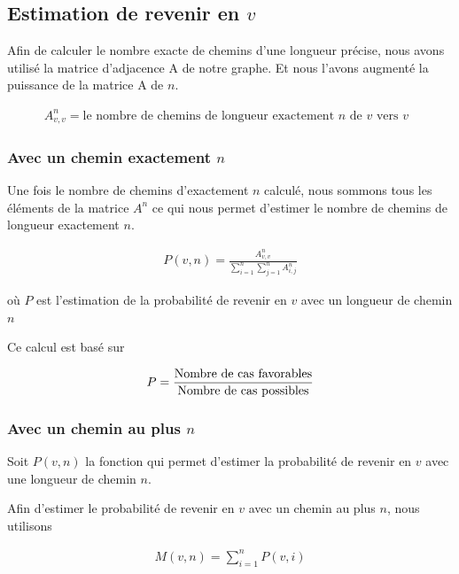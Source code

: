 \documentclass[a4paper, 11pt, oneside]{article}
\begin{document}
		\subsection{Estimation de revenir en $v$}
					Afin de calculer le nombre exacte de chemins d'une longueur précise, nous avons utilisé la matrice d'adjacence A de notre graphe. Et nous l'avons augmenté la puissance de la matrice A de $n$.
		
		\begin{ceqn}
			\begin{align*}
				A^n_{v, v} = \text{le nombre de chemins de longueur exactement $n$ de $v$ vers $v$ } 
			\end{align*}
		\end{ceqn}
			\subsubsection{Avec un chemin exactement $n$}
				Une fois le nombre de chemins d'exactement $n$ calculé, nous sommons tous les éléments de la matrice $A^n$ ce qui nous permet d'estimer le nombre de chemins de longueur exactement $n$.
				
				\begin{ceqn}
					\begin{align*}
						P (v, n) = \frac{A^n_{v, v}}{\sum_{i=1}^{n} \sum_{j=1}^{n} A^n_{i, j}}
					\end{align*}
				\end{ceqn}
			où $P$ est l'estimation de la probabilité de revenir en $v$ avec un longueur de chemin $n$
			
			Ce calcul est basé sur 
			\begin{ceqn}
				\begin{align*}
					P =  \frac{\textnormal{Nombre de cas favorables}}{\textnormal{Nombre de cas possibles}}
				\end{align*}
			\end{ceqn}
		
			\subsubsection{Avec un chemin au plus $n$}
			Soit $P(v, n)$ la fonction qui permet d'estimer la probabilité de revenir en $v$ avec une longueur de chemin $n$.
			
			Afin d'estimer le probabilité de revenir en $v$ avec un chemin au plus $n$, nous utilisons
			
			\begin{ceqn}
				\begin{align*}
					M(v, n) = \sum_{i=1}^{n} P(v, i)
				\end{align*}
			\end{ceqn}
			
\end{document}
